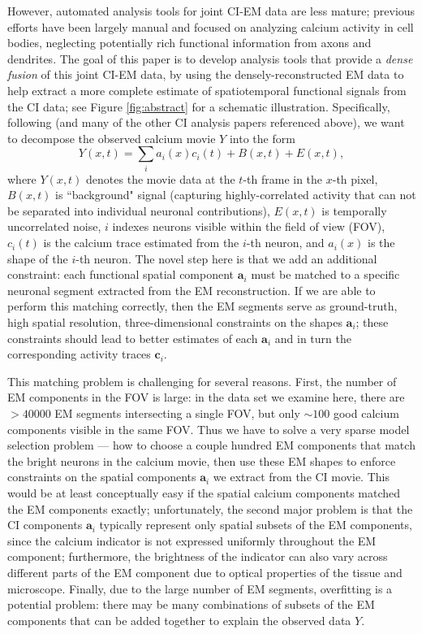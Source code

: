 \documentclass[10pt,letterpaper]{article}
\begin{document}
However, automated analysis tools for joint CI-EM data are less mature; previous efforts have been largely manual and focused on analyzing calcium activity in cell bodies, neglecting potentially rich functional information from axons and dendrites.  
The goal of this paper is to develop analysis tools that provide a \emph{dense fusion} of this joint CI-EM data, by using the densely-reconstructed EM data to help extract a more complete estimate of spatiotemporal functional signals from the CI data; see Figure \ref{fig:abstract} for a schematic illustration.  Specifically, following \citep{Pnevmatikakis2016} (and many of the other CI analysis papers referenced above), we want to decompose the observed calcium movie $Y$ into the form 
$$Y(x,t)=\sum_i a_i(x) c_i(t) + B(x,t) + E(x,t),$$
where $Y(x,t)$ denotes the movie data at the $t$-th frame in the $x$-th pixel, $B(x,t)$ is ``background" signal (capturing highly-correlated activity that can not be separated into individual neuronal contributions), $E(x,t)$ is temporally uncorrelated noise, $i$ indexes neurons visible within the field of view (FOV), $c_i(t)$ is the calcium trace estimated from the $i$-th neuron, and $a_i(x)$ is the shape of the $i$-th neuron.  The novel step here is that we add an additional constraint: each functional spatial component $\bm{a}_i$ must be matched to a specific neuronal segment extracted from the EM reconstruction.  If we are able to perform this matching correctly, then the EM segments serve as ground-truth, high spatial resolution, three-dimensional constraints on the shapes $\bm{a}_i$; these constraints should lead to better estimates of each $\bm{a}_i$ and in turn the corresponding activity traces $\bm{c}_i$.

This matching problem is challenging for several reasons.  First, the number of EM components in the FOV is large: in the data set we examine here, there are $>40000$ EM segments intersecting a single FOV, but only $\sim 100$ good calcium components visible in the same FOV.  Thus we have to solve a very sparse model selection problem --- how to choose a couple hundred EM components that match the bright neurons in the calcium movie, then use these EM shapes to enforce constraints on the spatial components $\bm{a}_i$ we extract from the CI movie.  This would be at least conceptually easy if the spatial calcium components matched the EM components exactly; unfortunately, the second major problem is that the CI components $\bm{a}_i$ typically represent only spatial subsets of the EM components, since the calcium indicator is not expressed uniformly throughout the EM component; furthermore, the brightness of the indicator can also vary across different parts of the EM component due to optical properties of the tissue and microscope. 
Finally, due to the large number of EM segments, overfitting is a potential problem: there may be many combinations of subsets of the EM components that can be added together to explain the observed data $Y$.
\end{document}
